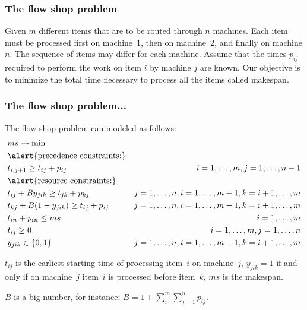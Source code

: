 \documentclass[landscape]{beamer}
\begin{document}
\begin{frame}[fragile]
  \frametitle{The flow shop problem}  
\begin{small} 
Given $m$ different items that are to be routed through $n$ machines.
Each item must be processed first on machine~1, then on 
machine~2, and finally on machine $n$. 
The sequence of items may differ for each machine.
Assume that the times $p_{ij}$ required to perform the work on item $i$
by machine $j$ are known.
Our objective is to minimize the total time necessary to process 
all the items called makespan. 
\end{small}
\end{frame}

\begin{frame}[fragile]
  \frametitle{The flow shop problem...}  
\begin{footnotesize} 
The flow shop problem can modeled as follows: 
\begin{align*}
    &ms\rightarrow \min&\\
    &\text{\alert{precedence constraints:}}&\\
   &t_{i,j+1}\geq t_{ij}+p_{ij} &i=1,\ldots,m, j=1,\ldots,n-1\\
    &\text{\alert{resource constraints:}}&\\
   &t_{ij}+B y_{jik}\geq t_{jk}+p_{kj} &j=1,\ldots,n, i=1,\ldots,m-1, k=i+1,\ldots,m\\
    &t_{kj}+B(1-y_{jik})\geq t_{ij}+p_{ij} &j=1,\ldots,n, i=1,\ldots,m-1, k=i+1,\ldots,m\\
    &t_{in}+p_{in}\leq ms &i=1,\ldots,m\\ 
    &t_{ij}\geq 0&i=1,\ldots,m, j=1,\ldots,n\\
    &y_{jik}\in \{0,1\}&j=1,\ldots,n, i=1,\ldots,m-1, k=i+1,\ldots,m
\end{align*}

 $t_{ij}$ is the earliest starting time of processing item~$i$ on
machine~$j$, $y_{jik}=1$ if and only if on machine~$j$  item~$i$ is processed before item~$k$,
$ms$ is the makespan.

$B$ is a big number, for instance: $B=1+\sum_{i}^{m}\sum_{j=1}^n p_{ij}$.
\end{footnotesize}
\end{frame}
\end{document}
